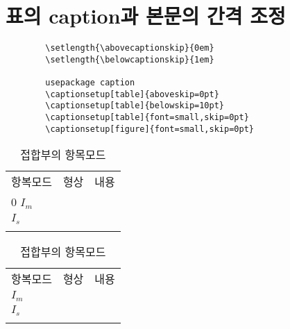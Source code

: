 		
		



%
%
%	
	\clearpage
	\section{표의 caption과 본문의 간격 조정}

		\begin{verbatim}
		\setlength{\abovecaptionskip}{0em}
		\setlength{\belowcaptionskip}{1em}

		usepackage caption 
		\captionsetup[table]{aboveskip=0pt}
		\captionsetup[table]{belowskip=10pt}
		\captionsetup[table]{font=small,skip=0pt}
		\captionsetup[figure]{font=small,skip=0pt}
		\end{verbatim}


		\begin{table}[h]
		\setlength{\abovecaptionskip}{0em}
		\setlength{\belowcaptionskip}{1em}

		\caption{접합부의 항목모드}
		\begin{tabu} to 1.0\textwidth { X[r,m, 1.0] X[c, 1.0] X[3.0] }
		\tabucline[0.2ex]{-}		
		항복모드	&형상		&내용\\
		\tabucline[0.2ex]{-}		0
		$I_m$		&\\
		\tabucline[0.01ex]{-}		
		$I_s$			&\\
		\tabucline[0.1ex]{-}		
		\end{tabu}
		\end{table}

		\begin{table}[h]
		\caption{접합부의 항목모드}
		\begin{tabu} to 1.0\textwidth { X[r,m, 1.0] X[c, 1.0] X[3.0] }
		\tabucline[0.2ex]{-}		
		항복모드	&형상		&내용\\
		\tabucline[0.2ex]{-}		
		$I_m$		&\\
		\tabucline[0.01ex]{-}		
		$I_s$			&\\
		\tabucline[0.1ex]{-}		
		\end{tabu}
		\end{table}



%
%
%	
	\clearpage
